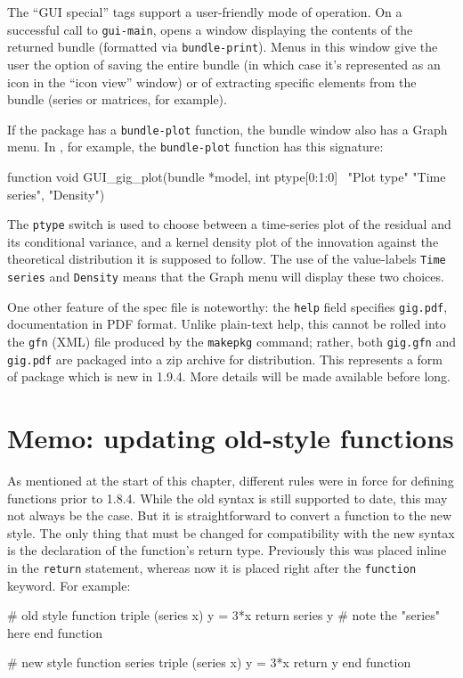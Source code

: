 The ``GUI special'' tags support a user-friendly mode of operation.
On a successful call to \texttt{gui-main},  opens a 
window displaying the contents of the returned bundle (formatted
via \texttt{bundle-print}). Menus in this window give the user the
option of saving the entire bundle (in which case it's represented
as an icon in the ``icon view'' window) or of extracting specific
elements from the bundle (series or matrices, for example). 

If the package has a \texttt{bundle-plot} function, the bundle window
also has a \textsf{Graph} menu. In , for example, the
\texttt{bundle-plot} function has this signature:
%
\begin{code}
function void GUI_gig_plot(bundle *model, int ptype[0:1:0] \
                           "Plot type" {"Time series", "Density"})
\end{code}

The \texttt{ptype} switch is used to choose between a time-series plot
of the residual and its conditional variance, and a kernel density
plot of the innovation against the theoretical distribution it is
supposed to follow. The use of the value-labels \texttt{Time series}
and \texttt{Density} means that the \textsf{Graph} menu will display
these two choices.

One other feature of the  spec file is noteworthy: the
\texttt{help} field specifies \texttt{gig.pdf}, documentation in PDF
format. Unlike plain-text help, this cannot be rolled into the
\texttt{gfn} (XML) file produced by the \texttt{makepkg} command;
rather, both \texttt{gig.gfn} and \texttt{gig.pdf} are packaged into a
zip archive for distribution. This represents a form of package
which is new in  1.9.4. More details will be made
available before long. 

\section{Memo: updating old-style functions}
\label{sec:old-func}

As mentioned at the start of this chapter, different rules were in
force for defining functions prior to \app{gretl} 1.8.4. While the old
syntax is still supported to date, this may not always be the
case. But it is straightforward to convert a function to the new
style. The only thing that must be changed for compatibility with the
new syntax is the declaration of the function's return
type. Previously this was placed inline in the \texttt{return}
statement, whereas now it is placed right after the \texttt{function}
keyword. For example:
%
\begin{code}
# old style
function triple (series x)
  y = 3*x
  return series y # note the "series" here
end function

# new style
function series triple (series x)
  y = 3*x
  return y
end function
\end{code}

